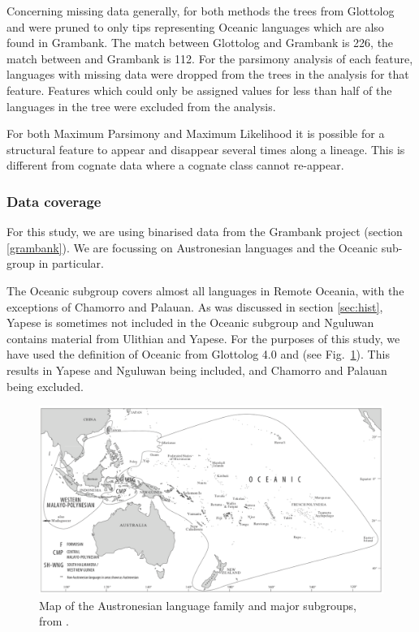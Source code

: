 \documentclass[draft,10pt]{article} %
\begin{document}
Concerning missing data generally, for both methods the trees from Glottolog and \citet{grayetal_2009} were pruned to only tips representing Oceanic languages which are also found in Grambank. The match between Glottolog and Grambank is 226, the match between \citet{grayetal_2009} and Grambank is 112. For the parsimony analysis of each feature, languages with missing data were dropped from the trees in the analysis for that feature. Features which could only be assigned values for less than half of the languages in the tree were excluded from the analysis.

For both Maximum Parsimony and Maximum Likelihood it is possible for a structural feature to appear and disappear several times along a lineage. This is different from cognate data where a cognate class cannot re-appear.



\subsubsection{Data coverage}
\label{asr:sec:GBcoverage}
For this study, we are using binarised data from the Grambank project (section \ref{grambank}). We are focussing on Austronesian languages and the Oceanic sub-group in particular. 

The Oceanic subgroup covers almost all languages in Remote Oceania, with the exceptions of Chamorro and Palauan. As was discussed in section \ref{sec:hist}, Yapese is sometimes not included in the Oceanic subgroup and Nguluwan contains material from Ulithian and Yapese. For the purposes of this study, we have used the definition of Oceanic from Glottolog 4.0 \citep{glottolog40} and \citet[2]{protooceanicvol5} (see Fig.~\ref{Oceanic_map}). This results in Yapese and Nguluwan being included, and Chamorro and Palauan being excluded.

\begin{figure}[h]
\centering
\includegraphics[width=\textwidth]{illustrations/ross_pawley_osmond_protooceanic_vol5.png}
\caption{{Map of the Austronesian language family and major subgroups, from \citet[2]{protooceanicvol5}.}}
\label{Oceanic_map}
\end{figure} 
\end{document}
